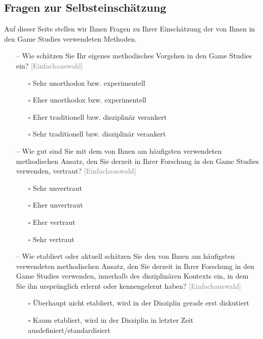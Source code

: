 \documentclass{scrartcl}
\begin{document}
\subsection*{Fragen zur Selbsteinschätzung}
Auf dieser Seite stellen wir Ihnen Fragen zu Ihrer Einschätzung der von Ihnen in den Game Studies verwendeten Methoden.

\begin{itemize}
   \item[--] Wie schätzen Sie Ihr eigenes methodisches Vorgehen in den Game Studies ein? \textcolor{gray}{\textsf{[Einfachauswahl]}}
   \begin{itemize}
      \item[$\square$] Sehr unorthodox bzw. experimentell
      \item[$\square$] Eher unorthodox bzw. experimentell
      \item[$\square$] Eher traditionell bzw. disziplinär verankert
      \item[$\square$] Sehr traditionell bzw. disziplinär verankert
   \end{itemize}
   \item[--] Wie gut sind Sie mit dem von Ihnen am häufigsten verwendeten methodischen Ansatz, den Sie derzeit in Ihrer Forschung in den Game Studies verwenden, vertraut? \textcolor{gray}{\textsf{[Einfachauswahl]}}
   \begin{itemize}
      \item[$\square$] Sehr unvertraut
      \item[$\square$] Eher unvertraut
      \item[$\square$] Eher vertraut
      \item[$\square$] Sehr vertraut
   \end{itemize}
   \item[--] Wie etabliert oder aktuell schätzen Sie den von Ihnen am häufigsten verwendeten methodischen Ansatz, den Sie derzeit in Ihrer Forschung in den Game Studies verwenden, innerhalb des disziplinären Kontexts ein, in dem Sie ihn ursprünglich erlernt oder kennengelernt haben? \textcolor{gray}{\textsf{[Einfachauswahl]}}
   \begin{itemize}
      \item[$\square$] Überhaupt nicht etabliert, wird in der Disziplin gerade erst diskutiert
      \item[$\square$] Kaum etabliert, wird in der Disziplin in letzter Zeit ausdefiniert/standardisiert

\end{itemize}
\end{itemize}
\end{document}
